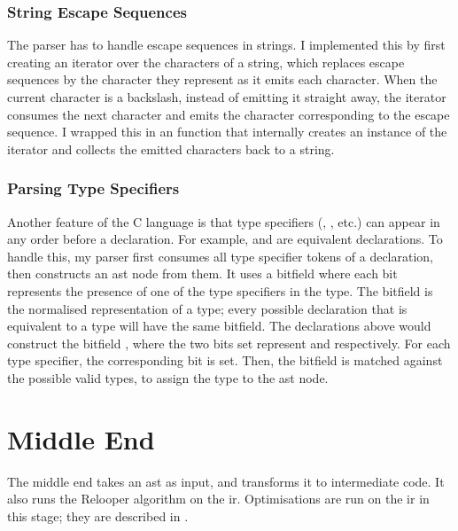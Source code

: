 \documentclass[00-main.tex]{subfiles}
\begin{document}
\subsubsection{String Escape Sequences}

The parser has to handle escape sequences in strings.
I implemented this by first creating an iterator over the characters of a string, which replaces escape sequences by the character they represent as it emits each character.
When the current character is a backslash, instead of emitting it straight away, the iterator consumes the next character and emits the character corresponding to the escape sequence.
I wrapped this in an  function that internally creates an instance of the iterator and collects the emitted characters back to a string.

\subsubsection{Parsing Type Specifiers}

Another feature of the C language is that type specifiers (, , etc.) can appear in any order before a declaration.
For example,  and  are equivalent declarations.
To handle this, my parser first consumes all type specifier tokens of a declaration, then constructs an  \gls{ast} node from them.
It uses a bitfield where each bit represents the presence of one of the type specifiers in the type.
The bitfield is the normalised representation of a type; every possible declaration that is equivalent to a type will have the same bitfield.
The declarations above would construct the bitfield , where the two bits set represent  and  respectively.
For each type specifier, the corresponding bit is set.
Then, the bitfield is matched against the possible valid types, to assign the type to the \gls{ast} node.


\section{Middle End}\label{sec:impl:middle end}

The middle end takes an \gls{ast} as input, and transforms it to intermediate code.
It also runs the Relooper algorithm on the \gls{ir}.
Optimisations are run on the \gls{ir} in this stage; they are described in .
\end{document}

